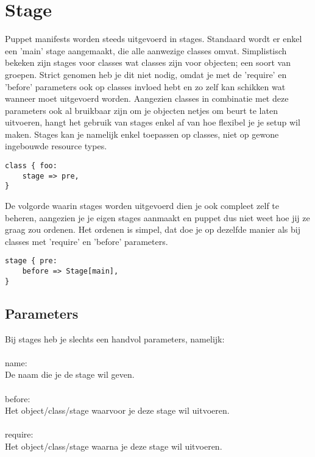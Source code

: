 \section{Stage}
Puppet manifests worden steeds uitgevoerd in stages. Standaard wordt er enkel een 'main'  stage aangemaakt, die alle aanwezige classes omvat. Simplistisch bekeken zijn stages voor classes wat classes zijn voor objecten; een soort van groepen. Strict genomen heb je dit niet nodig, omdat je met de 'require' en 'before' parameters ook op classes invloed hebt en zo zelf kan schikken wat wanneer moet uitgevoerd worden. Aangezien classes in combinatie met deze parameters ook al bruikbaar zijn om je objecten netjes om beurt te laten uitvoeren, hangt het gebruik van stages enkel af van hoe flexibel je je setup wil maken. Stages kan je namelijk enkel toepassen op classes, niet op gewone ingebouwde resource types.
%
\begin{code}
\begin{lstlisting}
class { foo:
	stage => pre,
}
\end{lstlisting}
\end{code}
%
De volgorde waarin stages worden uitgevoerd dien je ook compleet zelf te beheren, aangezien je je eigen stages aanmaakt en puppet dus niet weet hoe jij ze graag zou ordenen. Het ordenen is simpel, dat doe je op dezelfde manier als bij classes met 'require' en 'before' parameters.
%
\begin{code}
\begin{lstlisting}
stage { pre:
	before => Stage[main],
}
\end{lstlisting}
\end{code}
%
\subsection{Parameters}
Bij stages heb je slechts een handvol parameters, namelijk:\\\\
name:\\
De naam die je de stage wil geven.\\\\
before:\\
Het object/class/stage waarvoor je deze stage wil uitvoeren.\\\\
require:\\
Het object/class/stage waarna je deze stage wil uitvoeren.\\\\

